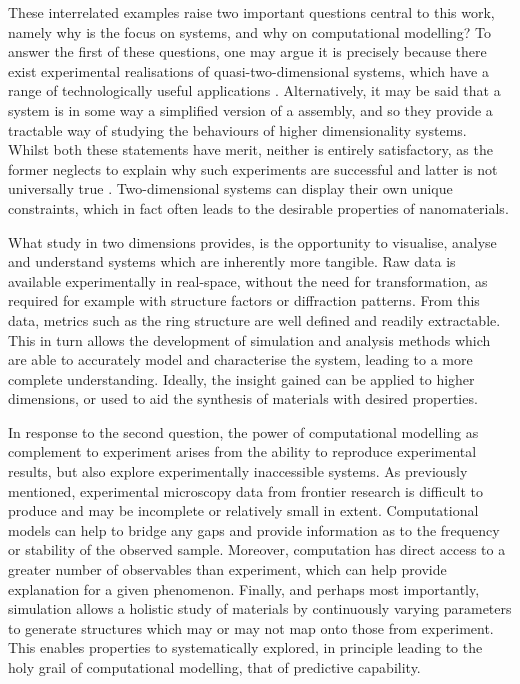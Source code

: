 These interrelated examples raise two important questions central to this work, namely why is the focus on \td{} systems, and why on computational modelling?
To answer the first of these questions, one may argue it is precisely because there exist experimental realisations of quasi\--two\--dimensional systems, which have a range of technologically useful applications \cite{Butler2013,Bhimanapati2015,Tan2017}.
Alternatively, it may be said that a \td{} system is in some way a simplified version of a \thd{} assembly, and so they provide a tractable way of studying the behaviours of higher dimensionality systems.
Whilst both these statements have merit, neither is entirely satisfactory, as the former neglects to explain why such experiments are successful and latter is not universally true \cite{ChaikinPaulM1995}.
Two\--dimensional systems can display their own unique constraints, which in fact often leads to the desirable properties of nanomaterials.

What study in two dimensions provides, is the opportunity to visualise, analyse and understand systems which are inherently more tangible.
Raw data is available experimentally in real\--space, without the need for transformation, as required for example with structure factors or diffraction patterns.
From this data, metrics such as the ring structure are well defined and readily extractable.
This in turn allows the development of simulation and analysis methods which are able to accurately model and characterise the system, leading to a more complete understanding.
Ideally, the insight gained can be applied to higher dimensions, or used to aid the synthesis of materials with desired properties.

In response to the second question, the power of computational modelling as complement to experiment arises from the ability to reproduce experimental results, but also explore experimentally inaccessible systems.
As previously mentioned, experimental microscopy data from frontier research is difficult to produce and may be incomplete or relatively small in extent.
Computational models can help to bridge any gaps and provide information as to the frequency or stability of the observed sample.
Moreover, computation has direct access to a greater number of observables than experiment, which can help provide explanation for a given phenomenon.
Finally, and perhaps most importantly, simulation allows a holistic study of materials by continuously varying parameters to generate structures which may or may not map onto those from experiment.
This enables properties to systematically explored, in principle leading to the holy grail of computational modelling, that of predictive capability.


